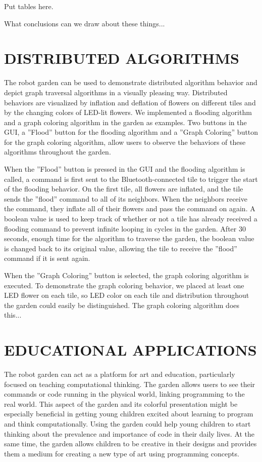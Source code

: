 \documentclass[letterpaper, 10 pt, conference]{ieeeconf}  %
\begin{document}
Put tables here.

What conclusions can we draw about these things...

\section{DISTRIBUTED ALGORITHMS}
The robot garden can be used to demonstrate distributed algorithm behavior and depict graph traversal algorithms in a visually pleasing way.  Distributed behaviors are visualized by inflation and deflation of flowers on different tiles and by the changing colors of LED-lit flowers.  We implemented a flooding algorithm and a graph coloring algorithm in the garden as examples.  Two buttons in the GUI, a ''Flood'' button for the flooding algorithm and a ''Graph Coloring'' button for the graph coloring algorithm, allow users to observe the behaviors of these algorithms throughout the garden.

When the ''Flood'' button is pressed in the GUI and the flooding algorithm is called, a command is first sent to the Bluetooth-connected tile to trigger the start of the flooding behavior.  On the first tile, all flowers are inflated, and the tile sends the ''flood'' command to all of its neighbors.  When the neighbors receive the command, they inflate all of their flowers and pass the command on again.  A boolean value is used to keep track of whether or not a tile has already received a flooding command to prevent infinite looping in cycles in the garden.  After 30 seconds, enough time for the algorithm to traverse the garden, the boolean value is changed back to its original value, allowing the tile to receive the ''flood'' command if it is sent again.

When the ''Graph Coloring'' button is selected, the graph coloring algorithm is executed.  To demonstrate the graph coloring behavior, we placed at least one LED flower on each tile, so LED color on each tile and distribution throughout the garden  could easily be distinguished.  The graph coloring algorithm does this...

\section{EDUCATIONAL APPLICATIONS}
The robot garden can act as a platform for art and education, particularly focused on teaching computational thinking.  The garden allows users to see their commands or code running in the physical world, linking programming to the real world.   This aspect of the garden and its colorful presentation might be especially beneficial in getting young children excited about learning to program and think computationally.  Using the garden could help young children to start thinking about the prevalence and importance of code in their daily lives.  At the same time, the garden allows children to be creative in their designs and provides them a medium for creating a new type of art using programming concepts.  
\end{document}
